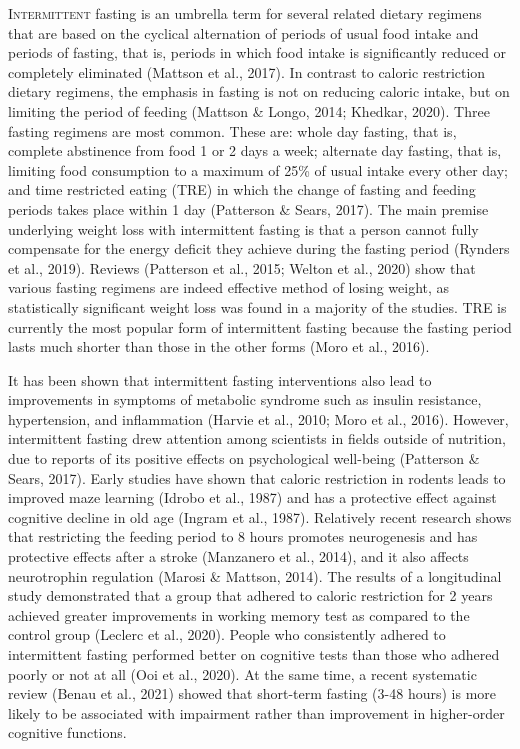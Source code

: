 \documentclass[authordate, empirical]{jote-new-article}
\begin{document}
\lettrine{I}{ntermittent} fasting is an umbrella term for several related dietary regimens that are based on the cyclical alternation of periods of usual food intake and periods of fasting, that is, periods in which food intake is significantly reduced or completely eliminated (Mattson et al., 2017). In contrast to caloric restriction dietary regimens, the emphasis in fasting is not on reducing caloric intake, but on limiting the period of feeding (Mattson \& Longo, 2014; Khedkar, 2020). Three fasting regimens are most common. These are: whole day fasting, that is, complete abstinence from food 1 or 2 days a week; alternate day fasting, that is, limiting food consumption to a maximum of 25\% of usual intake every other day; and time restricted eating (TRE) in which the change of fasting and feeding periods takes place within 1 day (Patterson \& Sears, 2017). The main premise underlying weight loss with intermittent fasting is that a person cannot fully compensate for the energy deficit they achieve during the fasting period (Rynders et al., 2019). Reviews (Patterson et al., 2015; Welton et al., 2020) show that various fasting regimens are indeed effective method of losing weight, as statistically significant weight loss was found in a majority of the studies. TRE is currently the most popular form of intermittent fasting because the fasting period lasts much shorter than those in the other forms (Moro et al., 2016).


It has been shown that intermittent fasting interventions also lead to improvements in symptoms of metabolic syndrome such as insulin resistance, hypertension, and inflammation (Harvie et al., 2010; Moro et al., 2016). However, intermittent fasting drew attention among scientists in fields outside of nutrition, due to reports of its positive effects on psychological well-being (Patterson \& Sears, 2017). Early studies have shown that caloric restriction in rodents leads to improved maze learning (Idrobo et al., 1987) and has a protective effect against cognitive decline in old age (Ingram et al., 1987). Relatively recent research shows that restricting the feeding period to 8 hours promotes neurogenesis and has protective effects after a stroke (Manzanero et al., 2014), and it also affects neurotrophin regulation (Marosi \& Mattson, 2014). The results of a longitudinal study demonstrated that a group that adhered to caloric restriction for 2 years achieved greater improvements in working memory test as compared to the control group (Leclerc et al., 2020). People who consistently adhered to intermittent fasting performed better on cognitive tests than those who adhered poorly or not at all (Ooi et al., 2020). At the same time, a recent systematic review (Benau et al., 2021) showed that short-term fasting (3-48 hours) is more likely to be associated with impairment rather than improvement in higher-order cognitive functions.
\end{document}
